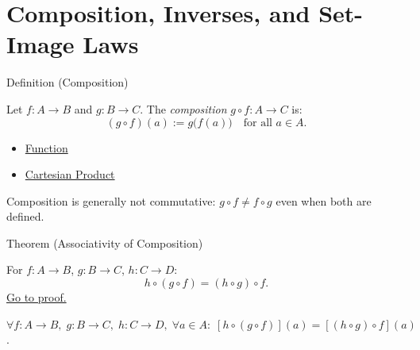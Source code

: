 
\section{Composition, Inverses, and Set-Image Laws}


\begin{definitionbox}{Definition (Composition)}
\begin{definition}[Composition]\label{def:composition}
Let $f : A \to B$ and $g : B \to C$. The \emph{composition} $g \circ f : A \to C$ is:
\[
(g \circ f)(a) := g\bigl(f(a)\bigr)
\quad\text{for all } a \in A.
\]
\end{definition}
\end{definitionbox}


\begin{dependencies}
\begin{itemize}
  \item \hyperref[def:function]{Function}
  \item \hyperref[def:cartesian-product-rel]{Cartesian Product}
\end{itemize}
\end{dependencies}

\begin{remark*}
Composition is generally not commutative: $g \circ f \neq f \circ g$ even
when both are defined.
\end{remark*}

\begin{theorembox}{Theorem (Associativity of Composition)}
\begin{theorem}\label{thm:comp-assoc}
For $f : A \to B$, $g : B \to C$, $h : C \to D$:
\[
h \circ (g \circ f) = (h \circ g) \circ f.
\]
\hyperref[prf:comp-assoc]{Go to proof.}
\end{theorem}
\end{theorembox}

\begin{remark*}
$\forall f\!:\!A\!\to\!B,\; g\!:\!B\!\to\!C,\; h\!:\!C\!\to\!D,\; \forall a \in A:\; [h \circ (g \circ f)](a) = [(h \circ g) \circ f](a)$.
\end{remark*}

